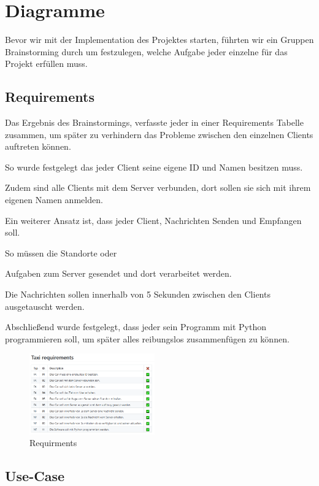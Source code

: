 \section{Diagramme}


Bevor wir mit der Implementation des Projektes starten, 
führten wir ein Gruppen Brainstorming durch um festzulegen, 
welche Aufgabe jeder einzelne für das Projekt erfüllen muss. 



\subsection{Requirements}

Das Ergebnis des Brainstormings, verfasste jeder in einer Requirements Tabelle zusammen, um später zu verhindern das Probleme zwischen den einzelnen Clients auftreten können.


So wurde festgelegt das jeder Client seine eigene ID und Namen besitzen muss. 


Zudem sind alle Clients mit dem Server verbunden, dort sollen sie sich mit ihrem eigenen Namen anmelden.


Ein weiterer Ansatz ist, dass jeder Client, Nachrichten Senden und Empfangen soll. 


So müssen die Standorte oder 

Aufgaben zum Server gesendet und dort verarbeitet werden.


Die Nachrichten sollen innerhalb von 5 Sekunden zwischen den Clients ausgetauscht werden.


Abschließend wurde festgelegt, dass jeder sein Programm mit Python programmieren soll, um später alles reibungslos zusammenfügen zu können.


\begin{figure}[htbp] 
  \centering
     \includegraphics[width=0.48\textwidth]{Bsp_requirments.png}
     \caption{Requirments}
\end{figure}




\subsection{Use-Case}

